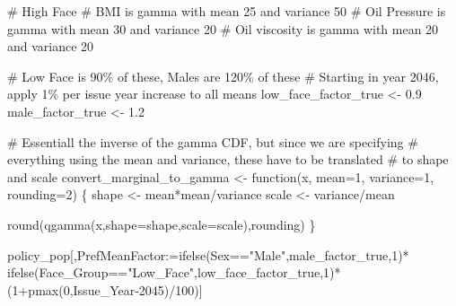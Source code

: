\documentclass[
  letterpaper,
  DIV=11,
  numbers=noendperiod]{scrartcl}
\newenvironment{Shaded}{\begin{snugshade}}{\end{snugshade}}
\newcommand{\AttributeTok}[1]{\textcolor[rgb]{0.40,0.45,0.13}{#1}}
\newcommand{\CommentTok}[1]{\textcolor[rgb]{0.37,0.37,0.37}{#1}}
\newcommand{\ControlFlowTok}[1]{\textcolor[rgb]{0.00,0.23,0.31}{#1}}
\newcommand{\DecValTok}[1]{\textcolor[rgb]{0.68,0.00,0.00}{#1}}
\newcommand{\ErrorTok}[1]{\textcolor[rgb]{0.68,0.00,0.00}{#1}}
\newcommand{\FloatTok}[1]{\textcolor[rgb]{0.68,0.00,0.00}{#1}}
\newcommand{\FunctionTok}[1]{\textcolor[rgb]{0.28,0.35,0.67}{#1}}
\newcommand{\NormalTok}[1]{\textcolor[rgb]{0.00,0.23,0.31}{#1}}
\newcommand{\OtherTok}[1]{\textcolor[rgb]{0.00,0.23,0.31}{#1}}
\newcommand{\SpecialCharTok}[1]{\textcolor[rgb]{0.37,0.37,0.37}{#1}}
\newcommand{\StringTok}[1]{\textcolor[rgb]{0.13,0.47,0.30}{#1}}
\begin{document}
\begin{Shaded}
\begin{Highlighting}[]
\CommentTok{\# High Face}
\CommentTok{\# BMI is gamma with mean 25 and variance 50}
\CommentTok{\# Oil Pressure is gamma with mean 30 and variance 20}
\CommentTok{\# Oil viscosity is gamma with mean 20 and variance 20}

\CommentTok{\# Low Face is 90\% of these, Males are 120\% of these}
\CommentTok{\# Starting in year 2046, apply 1\% per issue year increase to all means}
\NormalTok{low\_face\_factor\_true }\OtherTok{\textless{}{-}} \FloatTok{0.9}
\NormalTok{male\_factor\_true }\OtherTok{\textless{}{-}} \FloatTok{1.2}

\CommentTok{\# Essentiall the inverse of the gamma CDF, but since we are specifying }
\CommentTok{\# everything using the mean and variance, these have to be translated }
\CommentTok{\# to shape and scale}
\NormalTok{convert\_marginal\_to\_gamma }\OtherTok{\textless{}{-}} \ControlFlowTok{function}\NormalTok{(x, }\AttributeTok{mean=}\DecValTok{1}\NormalTok{, }\AttributeTok{variance=}\DecValTok{1}\NormalTok{, }\AttributeTok{rounding=}\DecValTok{2}\NormalTok{) \{}
\NormalTok{  shape }\OtherTok{\textless{}{-}}\NormalTok{ mean}\SpecialCharTok{*}\NormalTok{mean}\SpecialCharTok{/}\NormalTok{variance}
\NormalTok{  scale }\OtherTok{\textless{}{-}}\NormalTok{ variance}\SpecialCharTok{/}\NormalTok{mean}
  
  \FunctionTok{round}\NormalTok{(}\FunctionTok{qgamma}\NormalTok{(x,}\AttributeTok{shape=}\NormalTok{shape,}\AttributeTok{scale=}\NormalTok{scale),rounding)}
\NormalTok{\}}

\NormalTok{policy\_pop[,PrefMeanFactor}\SpecialCharTok{:}\ErrorTok{=}\FunctionTok{ifelse}\NormalTok{(Sex}\SpecialCharTok{==}\StringTok{"Male"}\NormalTok{,male\_factor\_true,}\DecValTok{1}\NormalTok{)}\SpecialCharTok{*}
             \FunctionTok{ifelse}\NormalTok{(Face\_Group}\SpecialCharTok{==}\StringTok{"Low\_Face"}\NormalTok{,low\_face\_factor\_true,}\DecValTok{1}\NormalTok{)}\SpecialCharTok{*}
\NormalTok{             (}\DecValTok{1}\SpecialCharTok{+}\FunctionTok{pmax}\NormalTok{(}\DecValTok{0}\NormalTok{,Issue\_Year}\DecValTok{{-}2045}\NormalTok{)}\SpecialCharTok{/}\DecValTok{100}\NormalTok{)]}


\end{Highlighting}
\end{Shaded}
\end{document}
